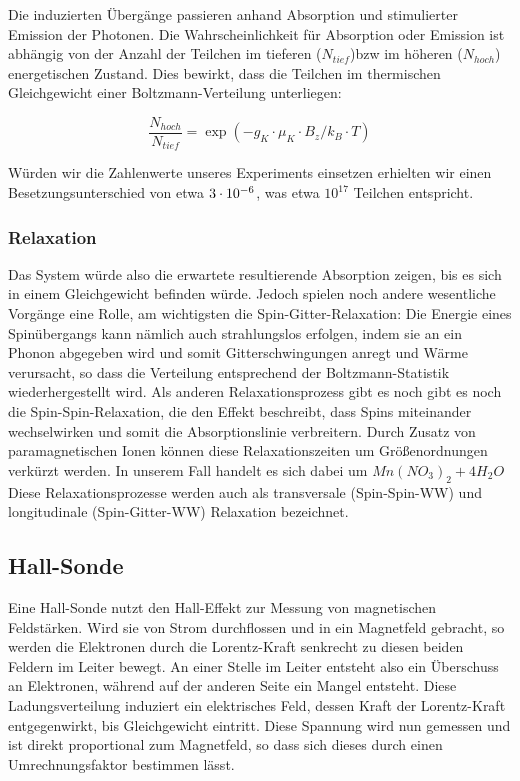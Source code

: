 Die induzierten Übergänge passieren anhand Absorption und stimulierter Emission der Photonen. Die Wahrscheinlichkeit für Absorption oder Emission ist abhängig von der Anzahl der Teilchen im tieferen ($N_{tief}$)bzw im höheren ($N_{hoch}$) energetischen Zustand. Dies bewirkt, dass die Teilchen im thermischen Gleichgewicht einer Boltzmann-Verteilung unterliegen:

$$\frac{N_{hoch}}{N_{tief}} = \exp(-g_K\cdot\mu_K\cdot B_z/k_B\cdot T)$$

Würden wir die Zahlenwerte unseres Experiments einsetzen erhielten wir einen Besetzungsunterschied von etwa $3\cdot 10^{-6}$, was etwa $10^{17}$ Teilchen entspricht. 

\subsubsection{Relaxation}

Das System würde also die erwartete resultierende Absorption zeigen, bis es sich in einem Gleichgewicht befinden würde. Jedoch spielen noch andere wesentliche Vorgänge eine Rolle, am wichtigsten die Spin-Gitter-Relaxation:
Die Energie eines Spinübergangs kann nämlich auch strahlungslos erfolgen, indem sie an ein Phonon abgegeben wird und somit Gitterschwingungen anregt und Wärme verursacht, so dass die Verteilung entsprechend der Boltzmann-Statistik wiederhergestellt wird.
Als anderen Relaxationsprozess gibt es noch gibt es noch die Spin-Spin-Relaxation, die den Effekt beschreibt, dass Spins miteinander wechselwirken und somit die Absorptionslinie verbreitern. 
Durch Zusatz von paramagnetischen Ionen können diese Relaxationszeiten um Größenordnungen verkürzt werden. In unserem Fall handelt es sich dabei um $Mn(NO_3)_2 + 4 H_2O$
Diese Relaxationsprozesse werden auch als transversale (Spin-Spin-WW) und longitudinale (Spin-Gitter-WW) Relaxation bezeichnet.

\subsection{Hall-Sonde}

Eine Hall-Sonde nutzt den Hall-Effekt zur Messung von magnetischen Feldstärken. Wird sie von Strom durchflossen und in ein Magnetfeld gebracht, so werden die Elektronen durch die Lorentz-Kraft senkrecht zu diesen beiden Feldern im Leiter bewegt. An einer Stelle im Leiter entsteht also ein Überschuss an Elektronen, während auf der anderen Seite ein Mangel entsteht. Diese Ladungsverteilung induziert ein elektrisches Feld, dessen Kraft der Lorentz-Kraft entgegenwirkt, bis Gleichgewicht eintritt. Diese Spannung wird nun gemessen und ist direkt proportional zum Magnetfeld, so dass sich dieses durch einen Umrechnungsfaktor bestimmen lässt.

